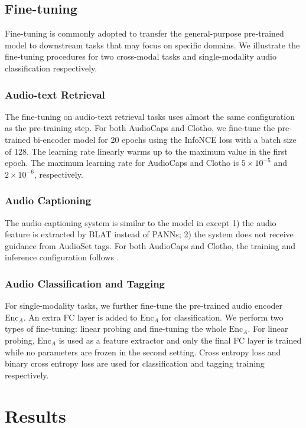 \documentclass[sigconf]{acmart}
\begin{document}
\subsection{Fine-tuning}
Fine-tuning is commonly adopted to transfer the general-purpose pre-trained model to downstream tasks that may focus on specific domains.
We illustrate the fine-tuning procedures for two cross-modal tasks and single-modality audio classification respectively.  
\subsubsection{Audio-text Retrieval}
The fine-tuning on audio-text retrieval tasks uses almost the same configuration as the pre-training step.
For both AudioCaps and Clotho, we fine-tune the pre-trained bi-encoder model for 20 epochs using the InfoNCE loss with a batch size of 128.
The learning rate linearly warms up to the maximum value in the first epoch.
The maximum learning rate for AudioCaps and Clotho is $5\times10^{-5}$ and $2\times10^{-6}$, respectively.

\subsubsection{Audio Captioning}
The audio captioning system is similar to the model in  except 1) the audio feature is extracted by BLAT instead of PANNs; 2) the system does not receive guidance from AudioSet tags.
For both AudioCaps and Clotho, the training and inference configuration follows .


\subsubsection{Audio Classification and Tagging}
For single-modality tasks, we further fine-tune the pre-trained audio encoder $\text{Enc}_A$.
An extra FC layer is added to $\text{Enc}_A$ for classification.
We perform two types of fine-tuning: linear probing and fine-tuning the whole $\text{Enc}_A$.
For linear probing, $\text{Enc}_A$ is used as a feature extractor and only the final FC layer is trained while no parameters are frozen in the second setting.
Cross entropy loss and binary cross entropy loss are used for classification and tagging training respectively.



\section{Results}
\end{document}
